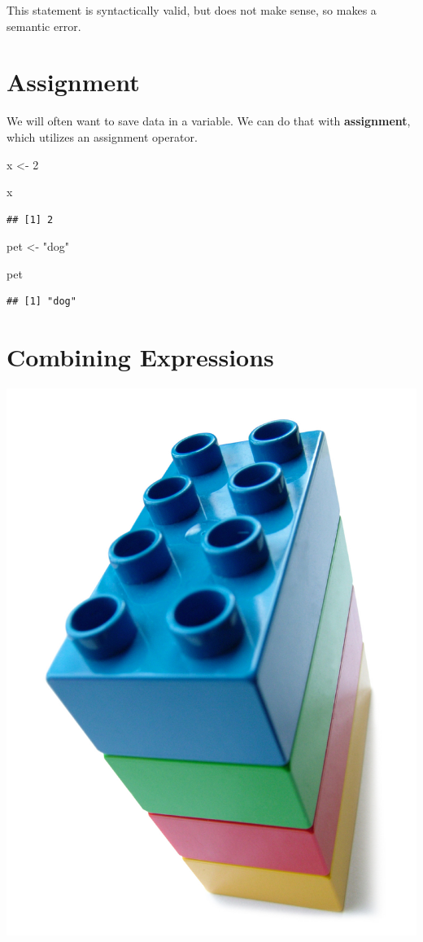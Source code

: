 \documentclass[
]{book}
\newenvironment{Shaded}{\begin{snugshade}}{\end{snugshade}}
\newcommand{\DecValTok}[1]{\textcolor[rgb]{0.00,0.00,0.81}{#1}}
\newcommand{\NormalTok}[1]{#1}
\newcommand{\OtherTok}[1]{\textcolor[rgb]{0.56,0.35,0.01}{#1}}
\newcommand{\StringTok}[1]{\textcolor[rgb]{0.31,0.60,0.02}{#1}}
\begin{document}
This statement is syntactically valid, but does not make sense, so makes a semantic error.

\hypertarget{assignment}{%
\section{Assignment}\label{assignment}}

We will often want to save data in a variable. We can do that with \textbf{assignment}, which utilizes an assignment operator.

\begin{Shaded}
\begin{Highlighting}[]
\NormalTok{x }\OtherTok{\textless{}{-}} \DecValTok{2}
\end{Highlighting}
\end{Shaded}

\begin{Shaded}
\begin{Highlighting}[]
\NormalTok{x}
\end{Highlighting}
\end{Shaded}

\begin{verbatim}
## [1] 2
\end{verbatim}

\begin{Shaded}
\begin{Highlighting}[]
\NormalTok{pet }\OtherTok{\textless{}{-}} \StringTok{"dog"}
\end{Highlighting}
\end{Shaded}

\begin{Shaded}
\begin{Highlighting}[]
\NormalTok{pet}
\end{Highlighting}
\end{Shaded}

\begin{verbatim}
## [1] "dog"
\end{verbatim}

\hypertarget{combining-expressions}{%
\section{Combining Expressions}\label{combining-expressions}}

\includegraphics[width=0.3\linewidth]{figures/blockstack}
\end{document}
